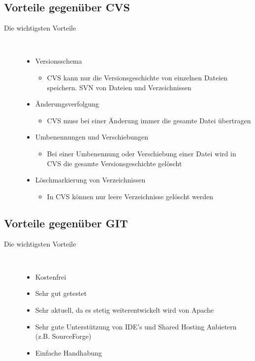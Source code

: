 \subsection{Vorteile gegen\"uber CVS}
\begin{description}
\item[Die wichtigsten Vorteile]~\par
   \begin{itemize}
      \item Versionsschema
      \begin{itemize}
         \item CVS kann nur die Versionsgeschichte von einzelnen Dateien speichern. SVN von Dateien und Verzeichnissen
      \end{itemize}
      \item \"Anderungsverfolgung
        \begin{itemize}
         \item CVS muss bei einer \"Anderung immer die gesamte Datei \"ubertragen
      \end{itemize}
      \item Umbenennungen und Verschiebungen
              \begin{itemize}
         \item Bei einer Umbenennung oder Verschiebung einer Datei wird in CVS die gesamte Versionsgeschichte gel\"oscht
      \end{itemize}
      \item L\"oschmarkierung von Verzeichnissen
              \begin{itemize}
         \item In CVS k\"onnen nur leere Verzeichnisse gel\"oscht werden
      \end{itemize}
   \end{itemize}
\end{description}
 
 \subsection{Vorteile gegen\"uber GIT}
\begin{description}
\item[Die wichtigsten Vorteile]~\par
   \begin{itemize}
      \item Kostenfrei
      \item Sehr gut getestet
      \item Sehr aktuell, da es stetig weiterentwickelt wird von Apache
      \item Sehr gute Unterst\"utzung von IDE's und Shared Hosting Anbietern (z.B. SourceForge)
         \item Einfache Handhabung
   \end{itemize}
\end{description}
 
